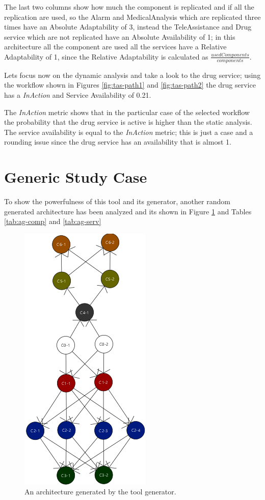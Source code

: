 The last two columns show how much the component is replicated and if all the replication are used, so the Alarm and MedicalAnalysis which are replicated three times have an Absolute Adaptability of 3, instead the TeleAssistance and Drug service which are not replicated have an Absolute Availability of 1; in this architecture all the component are used all the services have a Relative Adaptability of 1, since the Relative Adaptability is calculated as $\frac{usedComponents}{components}$.

Lets focus now on the dynamic analysis and take a look to the drug service; using the workflow shown in Figures \ref{fig:tas-path1} and \ref{fig:tas-path2} the drug service has a \emph{InAction} and Service Availability of 0.21. 

The \emph{InAction} metric shows that in the particular case of the selected workflow the probability that the drug service is active is higher than the static analysis. The service availability is equal to the \emph{InAction} metric; this is just a case and a rounding issue since the drug service has an availability that is almost 1.



\clearpage

\section{Generic Study Case}
To show the powerfulness of this tool and its generator, another random generated architecture has been analyzed and its shown in Figure \ref{fig:testarch} and Tables \ref{tab:ag-comp} and \ref{tab:ag-serv}

\begin{figure}[ht]
	\centerline
	{\includegraphics[scale=0.9]{img/autogenerated_arch.png}}
	\caption[AutoGenerated Architecture]{An architecture generated by the tool generator.}
	\label{fig:testarch}
\end{figure}

